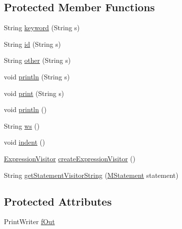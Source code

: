 \subsection*{Protected Member Functions}
\begin{DoxyCompactItemize}
\item 
String \hyperlink{classorg_1_1tzi_1_1use_1_1uml_1_1mm_1_1_m_m_print_visitor_ab39bb1821e42b4ad778f9f1a81e86231}{keyword} (String s)
\item 
String \hyperlink{classorg_1_1tzi_1_1use_1_1uml_1_1mm_1_1_m_m_print_visitor_a413d6ac44dd49c33e6ee27c7daec5b11}{id} (String s)
\item 
String \hyperlink{classorg_1_1tzi_1_1use_1_1uml_1_1mm_1_1_m_m_print_visitor_acd18efc0722f6593d49b9e9bb25514da}{other} (String s)
\item 
void \hyperlink{classorg_1_1tzi_1_1use_1_1uml_1_1mm_1_1_m_m_print_visitor_a6f8a78a23e796972fb31e58fcaff4d78}{println} (String s)
\item 
void \hyperlink{classorg_1_1tzi_1_1use_1_1uml_1_1mm_1_1_m_m_print_visitor_a096388e226e23a786c69d9d6e88bcdbc}{print} (String s)
\item 
void \hyperlink{classorg_1_1tzi_1_1use_1_1uml_1_1mm_1_1_m_m_print_visitor_a289d9437f5fa5c29f413499a8a45f9d9}{println} ()
\item 
String \hyperlink{classorg_1_1tzi_1_1use_1_1uml_1_1mm_1_1_m_m_print_visitor_a4d7b159d6bfc54d7f2749398506b8dc2}{ws} ()
\item 
void \hyperlink{classorg_1_1tzi_1_1use_1_1uml_1_1mm_1_1_m_m_print_visitor_ae8663adf9b930de9f5b6a83844293025}{indent} ()
\item 
\hyperlink{interfaceorg_1_1tzi_1_1use_1_1uml_1_1ocl_1_1expr_1_1_expression_visitor}{Expression\-Visitor} \hyperlink{classorg_1_1tzi_1_1use_1_1uml_1_1mm_1_1_m_m_print_visitor_ae478a95892b64ed86aac1335ec378d46}{create\-Expression\-Visitor} ()
\item 
String \hyperlink{classorg_1_1tzi_1_1use_1_1uml_1_1mm_1_1_m_m_print_visitor_a9e5352896959c6ef3859c884002ac245}{get\-Statement\-Visitor\-String} (\hyperlink{classorg_1_1tzi_1_1use_1_1uml_1_1sys_1_1soil_1_1_m_statement}{M\-Statement} statement)
\end{DoxyCompactItemize}
\subsection*{Protected Attributes}
\begin{DoxyCompactItemize}
\item 
Print\-Writer \hyperlink{classorg_1_1tzi_1_1use_1_1uml_1_1mm_1_1_m_m_print_visitor_a6744243473f8aeb1a5a93687fbfc95c5}{f\-Out}
\end{DoxyCompactItemize}


